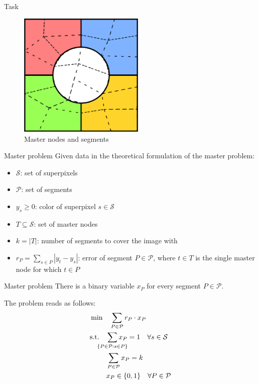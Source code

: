 \documentclass[fleqn]{beamer}
\newcommand{\superpixels}{\mathcal{S}}
\newcommand{\segments}{\mathcal{P}}
\begin{document}
    \begin{frame}{Task}
        \begin{figure}
            \begin{center}
                \includegraphics[width=60mm]{segments}
                \caption{Master nodes and segments}
            \end{center}
        \end{figure}
    \end{frame}	

    \begin{frame}{Master problem}
        Given data in the theoretical formulation of the master problem:
        \begin{itemize}
            \item $\superpixels$: set of superpixels
            \item $\segments$: set of segments %
            \item $y_s\geq0$: color of superpixel $s\in\superpixels$
            \item $T\subseteq\superpixels$: set of master nodes %
            \item $k=|T|$: number of segments to cover the image with
            \item $r_P=\sum_{s\in P}|y_t-y_s|$: error of segment $P\in\segments$,
            where $t\in T$ is the single master node for which $t\in P$
        \end{itemize}
    \end{frame}
	
	\begin{frame}{Master problem}
		There is a binary variable $x_P$ for every segment $P\in\segments$.
        
		The problem reads as follows:
		\begin{align}
    		&\min\quad \sum_{P\in\mathcal{P}} r_P\cdot x_P\\
		    &\text{s.t.}\quad \smashoperator{\sum_{\{P\in\mathcal{P}:s\in P\}}} x_P = 1 \quad\forall s\in\superpixels \\
		    &\phantom{\text{s.t.}\quad} \sum_{P\in\mathcal{P}} x_P = k \\
		    &\phantom{\text{s.t.}\quad} x_P \in \{0,1\} \quad\forall P\in\segments
		\end{align}
	\end{frame}
	
\end{document}
